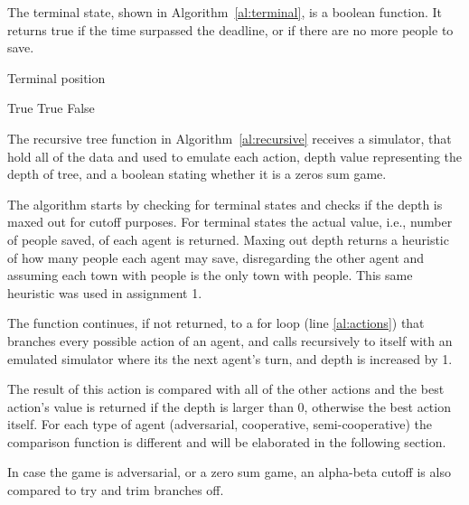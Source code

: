 \documentclass{article}                     %
\begin{document}
	The terminal state, shown in Algorithm~\ref{al:terminal}, is a boolean function. It returns true if the time surpassed the deadline, or if there are no more people to save. 
	

	
	\begin{algorithm}
		\caption{Terminal position}
		\label{al:terminal}		
		\begin{algorithmic}[1]
			\State  \Return True
			\State  \Return True
			\Else
			\State \Return False
			\EndIf
			\EndProcedure
		\end{algorithmic}
	\end{algorithm}
	
	The recursive tree function in Algorithm~\ref{al:recursive} receives a simulator, that hold all of the data and used to emulate each action, depth value representing the depth of tree, and a boolean stating whether it is a zeros sum game. 
	
	The algorithm starts by checking for terminal states and checks if the depth is maxed out for cutoff purposes. For terminal states the actual value, i.e., number of people saved, of each agent is returned. Maxing out depth returns a heuristic of how many people each agent may save, disregarding the other agent and assuming each town with people is the only town with people.
	This same heuristic was used in assignment 1.
	
	The function continues, if not returned, to a for loop (line \ref{al:actions}) that branches every possible action of an agent, and calls recursively to itself with an emulated simulator where its the next agent's turn, and depth is increased by 1. 
	
	The result of this action is compared with all of the other actions and the best action's value is returned if the depth is larger than 0, otherwise the best action itself.
	For each type of agent (adversarial, cooperative, semi-cooperative) the comparison function is different and will be elaborated in the following section.
	
	In case the game is adversarial, or a zero sum game, an alpha-beta cutoff is also compared to try and trim branches off.
	
\end{document}
